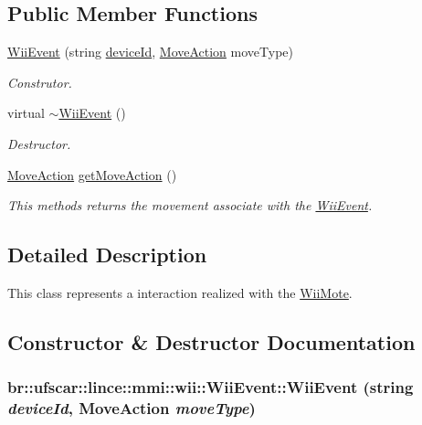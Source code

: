 \subsection*{Public Member Functions}
\begin{DoxyCompactItemize}
\item 
\hyperlink{classbr_1_1ufscar_1_1lince_1_1mmi_1_1wii_1_1WiiEvent_a19e75f8059636771751af5a60ecd3e32}{WiiEvent} (string \hyperlink{classbr_1_1ufscar_1_1lince_1_1mmi_1_1MMIEvent_ab49d18c433659ed8e7dbdaa9004839d5}{deviceId}, \hyperlink{namespacebr_1_1ufscar_1_1lince_1_1mmi_1_1wii_ac3b3ecd83aff16881b7c4749768d6145}{MoveAction} moveType)
\begin{DoxyCompactList}\small\item\em Construtor. \item\end{DoxyCompactList}\item 
virtual \hyperlink{classbr_1_1ufscar_1_1lince_1_1mmi_1_1wii_1_1WiiEvent_ace3a3623e886671767522e4c7d28e2bb}{$\sim$WiiEvent} ()
\begin{DoxyCompactList}\small\item\em Destructor. \item\end{DoxyCompactList}\item 
\hyperlink{namespacebr_1_1ufscar_1_1lince_1_1mmi_1_1wii_ac3b3ecd83aff16881b7c4749768d6145}{MoveAction} \hyperlink{classbr_1_1ufscar_1_1lince_1_1mmi_1_1wii_1_1WiiEvent_a1bd7fdbcc56be18c294108041f8d65ee}{getMoveAction} ()
\begin{DoxyCompactList}\small\item\em This methods returns the movement associate with the \hyperlink{classbr_1_1ufscar_1_1lince_1_1mmi_1_1wii_1_1WiiEvent}{WiiEvent}. \item\end{DoxyCompactList}\end{DoxyCompactItemize}


\subsection{Detailed Description}
This class represents a interaction realized with the \hyperlink{classbr_1_1ufscar_1_1lince_1_1mmi_1_1wii_1_1WiiMote}{WiiMote}. 

\subsection{Constructor \& Destructor Documentation}
\hypertarget{classbr_1_1ufscar_1_1lince_1_1mmi_1_1wii_1_1WiiEvent_a19e75f8059636771751af5a60ecd3e32}{
\subsubsection[{WiiEvent}]{\setlength{\rightskip}{0pt plus 5cm}br::ufscar::lince::mmi::wii::WiiEvent::WiiEvent (string {\em deviceId}, \/  {\bf MoveAction} {\em moveType})}}
\label{classbr_1_1ufscar_1_1lince_1_1mmi_1_1wii_1_1WiiEvent_a19e75f8059636771751af5a60ecd3e32}


